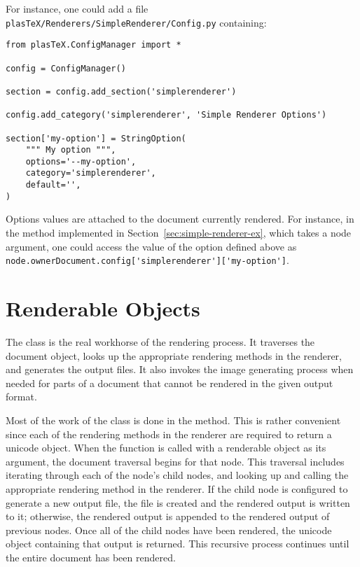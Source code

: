 For instance, one could add a file
\verb+plasTeX/Renderers/SimpleRenderer/Config.py+ containing:

\begin{verbatim}
from plasTeX.ConfigManager import *

config = ConfigManager()

section = config.add_section('simplerenderer')

config.add_category('simplerenderer', 'Simple Renderer Options')

section['my-option'] = StringOption(
    """ My option """,
    options='--my-option',
    category='simplerenderer',
    default='',
)
\end{verbatim}

Options values are attached to the document currently rendered. For
instance, in the  method implemented in
Section~\ref{sec:simple-renderer-ex}, which takes a node argument, one
could access the value of the option defined above as
\verb+node.ownerDocument.config['simplerenderer']['my-option']+.


\section{Renderable Objects\label{sec:renderable}}

The  class is the real workhorse of the rendering process.
It traverses the document object, looks up the appropriate rendering
methods in the renderer, and generates the output files.  It also
invokes the image generating process when needed for parts of a document
that cannot be rendered in the given output format.

Most of the work of the  class is done in the
 method.  This is rather convenient since each of
the rendering methods in the renderer are required to return a unicode
object.  When the  function is called with a renderable
object as its argument, the document traversal begins for that node.
This traversal includes iterating through each of the node's child nodes, and
looking up and calling the appropriate rendering method in the renderer.
If the child node is configured to generate a new output file, the
file is created and the rendered output is written to it; otherwise,
the rendered output is appended to the rendered output of previous nodes.
Once all of the child nodes have been rendered, the unicode object containing
that output is returned.  This recursive process continues until the
entire document has been rendered.

